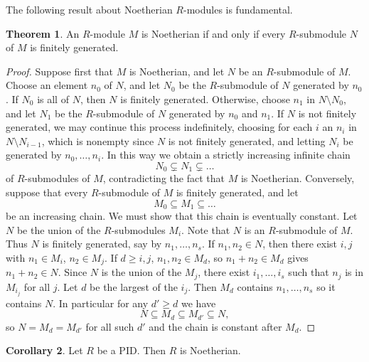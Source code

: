 \documentclass{article}
\theoremstyle{definition}\newtheorem{definition}{Definition}[subsection]
\theoremstyle{definition}\newtheorem{remark}[definition]{Remark}
\theoremstyle{definition}\newtheorem*{example}{Example}
\theoremstyle{definition}\newtheorem*{note}{Note}
\newtheorem{theorem}[definition]{Theorem}
\newtheorem{corollary}[definition]{Corollary}
\begin{document}
The following result about Noetherian $ R $-modules is fundamental.

\begin{theorem}
An $ R $-module $ M $ is Noetherian if and only if every $ R $-submodule $ N $ of $ M $ is finitely generated.
\end{theorem}

\begin{proof}
Suppose first that $ M $ is Noetherian, and let $ N $ be an $ R $-submodule of $ M $. Choose an element $ n_0 $ of $ N $, and let $ N_0 $ be the $ R $-submodule of $ N $ generated by $ n_0 $. If $ N_0 $ is all of $ N $, then $ N $ is finitely generated. Otherwise, choose $ n_1 $ in $ N \setminus N_0 $, and let $ N_1 $ be the $ R $-submodule of $ N $ generated by $ n_0 $ and $ n_1 $. If $ N $ is not finitely generated, we may continue this process indefinitely, choosing for each $ i $ an $ n_i $ in $ N \setminus N_{i - 1} $, which is nonempty since $ N $ is not finitely generated, and letting $ N_i $ be generated by $ n_0, \dots, n_i $. In this way we obtain a strictly increasing infinite chain
$$ N_0 \subsetneq N_1 \subsetneq \dots $$
of $ R $-submodules of $ M $, contradicting the fact that $ M $ is Noetherian. Conversely, suppose that every $ R $-submodule of $ M $ is finitely generated, and let
$$ M_0 \subseteq M_1 \subseteq \dots $$
be an increasing chain. We must show that this chain is eventually constant. Let $ N $ be the union of the $ R $-submodules $ M_i $. Note that $ N $ is an $ R $-submodule of $ M $. Thus $ N $ is finitely generated, say by $ n_1, \dots, n_s $. If $ n_1, n_2 \in N $, then there exist $ i, j $ with $ n_1 \in M_i $, $ n_2 \in M_j $. If $ d \ge i, j $, $ n_1, n_2 \in M_d $, so $ n_1 + n_2 \in M_d $ gives $ n_1 + n_2 \in N $. Since $ N $ is the union of the $ M_j $, there exist $ i_1, \dots, i_s $ such that $ n_j $ is in $ M_{i_j} $ for all $ j $. Let $ d $ be the largest of the $ i_j $. Then $ M_d $ contains $ n_1, \dots, n_s $ so it contains $ N $. In particular for any $ d' \ge d $ we have
$$ N \subseteq M_d \subseteq M_{d'} \subseteq N, $$
so $ N = M_d = M_{d'} $ for all such $ d' $ and the chain is constant after $ M_d $.
\end{proof}


\begin{corollary}
Let $ R $ be a PID. Then $ R $ is Noetherian.
\end{corollary}
\end{document}
